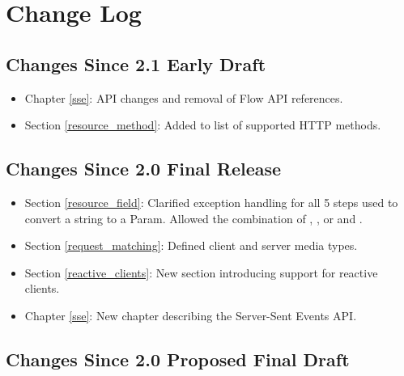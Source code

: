 \chapter{Change Log}

\section{Changes Since 2.1 Early Draft}

\begin{itemize}
\item Chapter \ref{sse}: API changes and removal of Flow API references.
\item Section \ref{resource_method}: Added  to list of supported HTTP methods.
\end{itemize}

\section{Changes Since 2.0 Final Release}

\begin{itemize}
\item Section \ref{resource_field}: Clarified exception handling for all 5 steps used to convert a string to a Param. Allowed the combination of , , or  and \ParamConverter.
\item Section \ref{request_matching}: Defined client and server media types.
\item Section \ref{reactive_clients}: New section introducing support for reactive clients.
\item Chapter \ref{sse}: New chapter describing the Server-Sent Events API.
\end{itemize}

\section{Changes Since 2.0 Proposed Final Draft}

